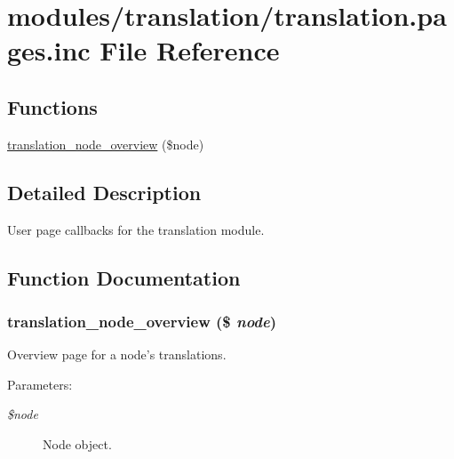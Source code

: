 \hypertarget{translation_8pages_8inc}{
\section{modules/translation/translation.pages.inc File Reference}
\label{translation_8pages_8inc}
}
\subsection*{Functions}
\begin{CompactItemize}
\item 
\hyperlink{translation_8pages_8inc_f25cd96e67d0bf2a6ac940f101b24d1e}{translation\_\-node\_\-overview} (\$node)
\end{CompactItemize}


\subsection{Detailed Description}
User page callbacks for the translation module. 

\subsection{Function Documentation}
\hypertarget{translation_8pages_8inc_f25cd96e67d0bf2a6ac940f101b24d1e}{
\subsubsection[{translation\_\-node\_\-overview}]{\setlength{\rightskip}{0pt plus 5cm}translation\_\-node\_\-overview (\$ {\em node})}}
\label{translation_8pages_8inc_f25cd96e67d0bf2a6ac940f101b24d1e}


Overview page for a node's translations.

\begin{Desc}
\item[Parameters:]
\begin{description}
\item[{\em \$node}]Node object. \end{description}
\end{Desc}
